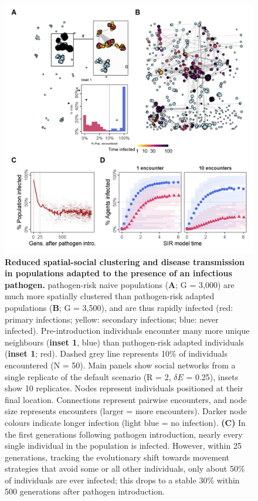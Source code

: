 \begin{figure}[!h]
    \centering
    \includegraphics[width=0.9\linewidth]{figures/pathomove/fig_networks_disease.png}
    \caption{
        \textbf{Reduced spatial-social clustering and disease transmission in populations adapted to the presence of an infectious pathogen.}
        pathogen-risk naive populations (\textbf{A}; G = 3,000) are much more spatially clustered than pathogen-risk adapted populations (\textbf{B}; G = 3,500), and are thus rapidly infected (red: primary infections; yellow: secondary infections; blue: never infected).
        Pre-introduction individuals encounter many more unique neighbours (\textbf{inset 1}, blue) than pathogen-risk adapted individuals (\textbf{inset 1}; red). 
        Dashed grey line represents 10\% of individuals encountered (N = 50).
        Main panels show social networks from a single replicate of the default scenario (R = 2, $\delta E$ = 0.25), insets show 10 replicates. Nodes represent individuals positioned at their final location. Connections represent pairwise encounters, and node size represents encounters (larger = more encounters). Darker node colours indicate longer infection (light blue = no infection). 
        \textbf{(C)} In the first generations following pathogen introduction, nearly every single individual in the population is infected. However, within 25 generations, tracking the evolutionary shift towards movement strategies that avoid some or all other individuals, only about 50\% of individuals are ever infected; this drops to a stable 30\% within 500 generations after pathogen introduction.
}
\end{figure}
